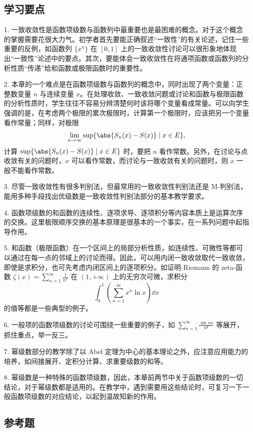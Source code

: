 \subsection{学习要点}

1. 一致收敛性是函数项级数与函数列中最重要也是最困难的概念。对于这个概念的掌握需要花很大力气。初学者首先要能正确叙述“一致性”的有关论述，记住一些重要的反例，如函数列 $\{x^n\}$ 在 $[0,1]$ 上的一致收敛性讨论可以很形象地体现出“一致性”论述中的要点。其次，要能体会一致收敛性在将通项函数或函数列的分析性质“传递”给和函数或极限函数时的重要性。

2. 本章的一个难点是在函数项级数与函数列的概念中，同时出现了两个变量：正整数变量 $n$ 与连续变量 $x$。在处理收敛、一致收敛问题或讨论和函数与极限函数的分析性质时，学生往往不容易分辨清楚何时该将哪个变量看成常量。可以向学生强调的是，在考虑两个极限的累次极限时，计算第一个极限时，应该把另一个变量看作常量；同样，对极限
\[
  \lim_{n\to\infty}\sup\{\abs{S_n(x)-S(x)}\mid x\in E\},
\]
计算 $\sup\{\abs{S_n(x)-S(x)}\mid x\in E\}$ 时，要把 $n$ 看作常数。另外，在讨论与点收敛有关的问题时，$x$ 可以看作常数，而讨论与一致收敛有关的问题时，则 $x$ 一般不能看作常数。

3. 尽管一致收敛性有很多判别法，但最常用的一致收敛性判别法还是 M-判别法，能用多种手段找出优级数是一致收敛性判别法部分的基本教学要求。

4. 函数项级数的和函数的连续性、逐项求导、逐项积分等内容本质上是运算次序的交换。这里极限顺序交换的基本原理是很基本的一个事实，在一系列问题中起指导作用。

5. 和函数（极限函数）在一个区间上的局部分析性质，如连续性、可微性等都可以通过在每一点的邻域上的讨论而得。因此，可以用内闭一致收敛取代一致收敛，即使是求积分，也可先考虑内闭区间上的逐项积分。如证明 Riemann 的 zeta-函数 $\displaystyle\zeta(x)=\sum_{n=1}^{\infty}\frac1{n^x}$ 在 $(1,+\infty)$ 上的无穷次可微，求积分
\[
  \int_0^1\left(\sum_{n=1}^{\infty}x^n\ln x\right)\dd x
\]
的值等都是一些典型的例子。

6. 一般项的函数项级数的讨论可围绕一些重要的例子，如 $\displaystyle\sum_{n=1}^{\infty}\frac{\sin nx}{n^p}$ 等展开，抓住重点，举一反三。

7. 幂级数部分的教学除了以 Abel 定理为中心的基本理论之外，应注意应用能力的培养，如间接展开、定积分计算、求重要级数的和等。

8. 幂级数是一种特殊的函数项级数，因此，本章前两节中关于函数项级数的一切结论，对于幂级数都是适用的。在教学中，遇到需要用这些结论时，可复习一下一般函数项级数的对应结论，以起到温故知新的作用。

\subsection{参考题}

